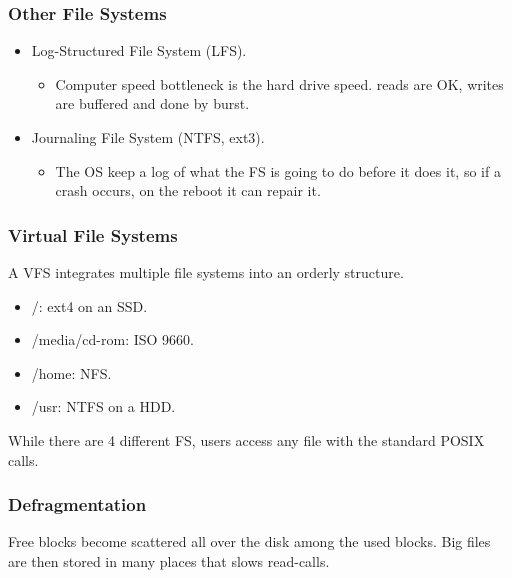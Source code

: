 
\begin{frame}
    \frametitle{Other File Systems}
    \begin{itemize}
        \item Log-Structured File System (LFS).
        \begin{itemize}
          \item Computer speed bottleneck is the hard drive speed. reads are OK, writes are buffered and done by burst.
        \end{itemize}
        \item Journaling File System (NTFS, ext3).
        \begin{itemize}
          \item The OS keep a log of what the FS is going to do before it does it, so if a crash occurs, on the reboot it can repair it.
        \end{itemize}
    \end{itemize}
\end{frame}

\begin{frame}
    \frametitle{Virtual File Systems}
    A VFS integrates multiple file systems into an orderly structure.
    \begin{itemize}
        \item /: ext4 on an SSD.
        \item /media/cd-rom: ISO 9660.
        \item /home: NFS.
        \item /usr: NTFS on a HDD.
    \end{itemize}
    While there are 4 different FS, users access any file with the standard POSIX calls.
\end{frame}

\begin{frame}
    \frametitle{Defragmentation}
    Free blocks become scattered all over the disk among the used blocks. Big files are then stored in many places that slows read-calls.
\end{frame}

